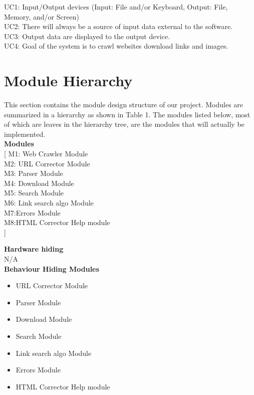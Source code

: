 \documentclass[titlepage]{article}
\newcommand{\group}[1]{{\leavevmode\color{red}[#1]}}
\begin{document}
\noindent
UC1: Input/Output devices (Input: File and/or Keyboard, Output: File, Memory, and/or
Screen)\\
UC2: There will always be a source of input data external to the software.\\
UC3: Output data are displayed to the output device.\\
UC4: Goal of the system is to crawl websites download links and images.\\

\section{Module Hierarchy}
This section contains the module design structure of our project. Modules are summarized in a hierarchy as shown in Table 1. The modules listed below, most of which are leaves in the hierarchy tree, are the modules that will actually be implemented.
\\

\textbf{Modules}\\

\noindent
\group{
M1: Web Crawler Module\\
M2: URL Corrector Module\\
M3: Parser Module\\
M4: Download Module\\
M5: Search Module\\
M6: Link search algo Module\\
M7:Errors Module\\
M8:HTML Corrector Help module\\
}



\textbf{Hardware hiding}\\

N/A\\

\textbf{Behaviour Hiding Modules}

\begin{itemize}
\item URL Corrector Module\\
\item Parser Module\\
\item Download Module\\
\item Search Module\\
\item Link search algo Module\\
\item Errors Module\\
\item HTML Corrector Help module

\end{itemize}
\end{document}

